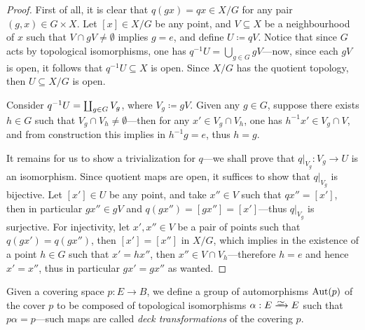 \begin{proof}
First of all, it is clear that \(q(g x) = q x \in X/G\) for any pair
\((g, x) \in G \times X\). Let \([x] \in X/G\) be any point, and
\(V \subseteq X\) be a neighbourhood of \(x\) such that
\(V \cap g V \neq \emptyset\) implies \(g = e\), and define \(U \coloneq q
V\). Notice that since \(G\) acts by topological isomorphisms, one has
\(q^{-1} U = \bigcup_{g \in G} g V\)---now, since each \(g V\) is open, it
follows that \(q^{-1} U \subseteq X\) is open. Since \(X/G\) has the quotient
topology, then \(U \subseteq X/G\) is open.

Consider \(q^{-1} U = \coprod_{g \in G} V_g\), where \(V_g \coloneq g
V\). Given any \(g \in G\), suppose there exists \(h \in G\) such that
\(V_g \cap V_h \neq \emptyset\)---then for any \(x' \in V_g \cap V_h\), one has
\(h^{-1} x' \in V_g \cap V\), and from construction this implies in
\(h^{-1} g = e\), thus \(h = g\).

It remains for us to show a trivialization for \(q\)---we shall prove that
\(q|_{V_g}: V_g \to U\) is an isomorphism. Since quotient maps are open, it
suffices to show that \(q|_{V_g}\) is bijective. Let \([x'] \in U\) be any
point, and take \(x'' \in V\) such that \(q x'' = [x']\), then in particular
\(g x'' \in g V\) and \(q(g x'') = [g x''] = [x']\)---thus \(q|_{V_g}\) is
surjective. For injectivity, let \(x', x'' \in V\) be a pair of points such that
\(q(g x') = q(g x'')\), then \([x'] = [x'']\) in \(X/G\), which implies in the
existence of a point \(h \in G\) such that \(x' = h x''\), then
\(x'' \in V \cap V_h\)---therefore \(h = e\) and hence \(x' = x''\), thus in
particular \(g x' = g x''\) as wanted.
\end{proof}

\begin{definition}
\label{def:deck-transformations}
Given a covering space \(p: E \to B\), we define a group of automorphisms
\(\operatorname{Aut}(p)\) of the cover \(p\) to be composed of topological isomorphisms
\(\alpha: E \isoto E\) such that \(p \alpha = p\)---such maps are called
\emph{deck transformations} of the covering \(p\).
\end{definition}

